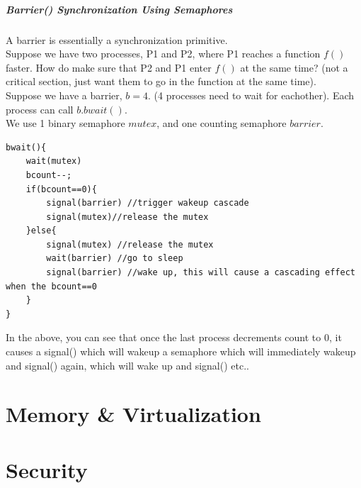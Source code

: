 \documentclass[12pt]{article}
\theoremstyle{definition}
\begin{document}
\subsubsection{Barrier() Synchronization Using Semaphores}
A barrier is essentially a synchronization primitive.
\\ \linebreak
Suppose we have two processes, P1 and P2, where P1 reaches a function $f()$ faster. How do make sure that P2 and P1 enter $f()$ at the same time? (not a critical section, just want them to go in the function at the same time). 
\\ \linebreak
Suppose we have a barrier, $b=4$. (4 processes need to wait for eachother). Each process can call $b.bwait()$.
\\ \linebreak
We use 1 binary semaphore $mutex$, and one counting semaphore $barrier$.
\\ \linebreak
\begin{lstlisting}
bwait(){
	wait(mutex)
	bcount--;
	if(bcount==0){
		signal(barrier) //trigger wakeup cascade
		signal(mutex)//release the mutex
	}else{
		signal(mutex) //release the mutex
		wait(barrier) //go to sleep
		signal(barrier) //wake up, this will cause a cascading effect when the bcount==0
	}
}
\end{lstlisting}
In the above, you can see that once the last process decrements count to 0, it causes a signal() which will wakeup a semaphore which will immediately wakeup and signal() again, which will wake up and signal() etc..

\part{Memory \& Virtualization}

\part{Security}
\end{document}
